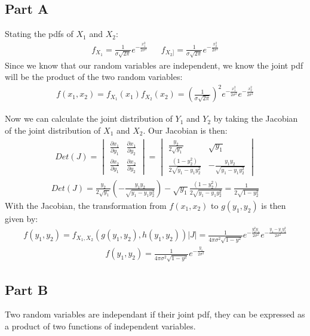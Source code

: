 \documentclass{article}
\begin{document}
\subsection*{Part A}
Stating the pdfs of $X_1$ and $X_2$:
\begin{align*}
f_{X_1} = \frac{1}{\sigma \sqrt{2 \pi}} e^{-\frac{x_1^2}{2 \sigma^2}} && f_{X_2]} =\frac{1}{\sigma \sqrt{2 \pi}} e^{-\frac{x_2^2}{2 \sigma^2}}
\end{align*}
Since we know that our random variables are independent, we know the joint pdf will be the product of the two random variables:
\begin{align*}
f(x_1,x_2) = f_{X_1}(x_1) f_{X_2}(x_2) = (\frac{1}{\sigma \sqrt{2 \pi}})^2 e^{-\frac{x_1^2}{2 \sigma^2}} e^{-\frac{x_2^2}{2 \sigma^2}}
\end{align*}

Now we can calculate the joint distribution of $Y_1$ and $Y_2$ by taking the Jacobian of the joint distribution of $X_1$ and $X_2$. Our Jacobian is then:
\begin{align*}
Det(J) = \begin{vmatrix}
\frac{\partial x_1}{\partial y_1} & \frac{\partial x_1}{\partial y_2} \\
\frac{\partial x_2}{\partial y_1} & \frac{\partial x_2}{\partial y_2}
\end{vmatrix} = \begin{vmatrix}
\frac{y_2}{2\sqrt{y_1}} & \sqrt{y_1} \\
\frac{(1-y^2_2)}{2\sqrt{y_1 - y_1 y_2^2}} & -\frac{y_1 y_2}{\sqrt{y_1 - y_1 y_2^2}}
\end{vmatrix}
\end{align*}
\begin{align*}
Det(J) = \frac{y_2}{2\sqrt{y_1}} (-\frac{y_1 y_2}{\sqrt{y_1 - y_1 y_2^2}}) - \sqrt{y_1} \frac{(1-y^2_2)}{2\sqrt{y_1 - y_1 y_2^2}} = \frac{1}{2\sqrt{1-y_2^2}}
\end{align*}
With the Jacobian, the transformation from $f(x_1,x_2)$ to $g(y_1,y_2)$ is then given by:
\begin{align*}
f(y_1,y_2) = f_{X_1,X_2}(g(y_1,y_2),h(y_1,y_2)) |J| = \frac{1}{4 \pi \sigma^2 \sqrt{1-y^2}} e^{-\frac{y_2^2 y_1}{2 \sigma^2}} e^{-\frac{y_1- y_1y_2^2}{2 \sigma^2}}
\end{align*}
\begin{align*}
\boxed { f(y_1,y_2) = \frac{1}{4 \pi \sigma^2 \sqrt{1-y^2}} e^{-\frac{y_1}{2\sigma^2}} }
\end{align*}
\subsection*{Part B}
Two random variables are independant if their joint pdf, they can be expressed as a product of two functions of independent variables.
\end{document}
